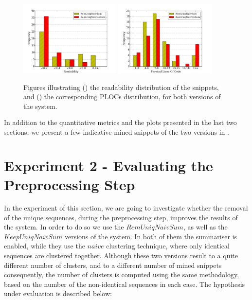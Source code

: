 \begin{figure}
\ffigbox
{%
  \begin{subfloatrow}[2]
  \ffigbox[\FBwidth]
    {\caption{}\label{res:exp1-readability}}
    {\includegraphics[width=0.45\textwidth]{results/exp1-readability.pdf}}
  \hspace{1em}%
  \ffigbox[\FBwidth]
    {\caption{}\label{res:exp1-plocs}}
    {\includegraphics[width=0.45\textwidth]{results/exp1-plocs.pdf}}
  \end{subfloatrow}}
  {\caption[Illustration of the PLOCs, and the readability metrics\protect\\($RemUniqNaivNoSum$, $RemUniqNaivNoSum$)]{Figures illustrating () the readability distribution of the snippets, and () the corresponding PLOCs distribution, for both versions of the system.}
\label{res:exp1-read-plocs}}
\end{figure}

In addition to the quantitative metrics and the plots presented in the last two sections, we present a few indicative mined snippets of the two versions in .


\section{Experiment 2 - Evaluating the Preprocessing Step}
\label{sec:evaluation-exp2}

In the experiment of this section, we are going to investigate whether the removal of the unique sequences, during the preprocessing step, improves the results of the system. In order to do so we use the $RemUniqNaivSum$, as well as the $KeepUniqNaivSum$ versions of the system. In both of them the summariser is enabled, while they use the $naive$ clustering technique, where only identical sequences are clustered together. Although these two versions result to a quite different number of clusters, and to a different number of mined snippets consequently, the number of clusters is computed using the same methodology, based on the number of the non-identical sequences in each case. The hypothesis under evaluation is described below:

